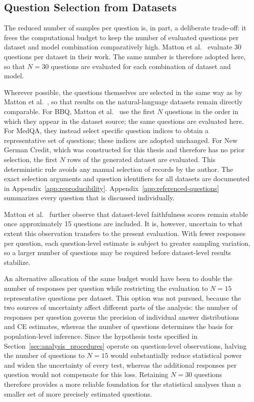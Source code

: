 \subsection{Question Selection from Datasets}
\label{sec:questions_per_dataset}
The reduced number of samples per question is, in part, a deliberate trade-off: it frees the computational budget to keep the number of evaluated questions per dataset and model combination comparatively high. Matton et al.~\cite{mattonWalkTalkMeasuring2024} evaluate 30 questions per dataset in their work. The same number is therefore adopted here, so that $N=30$ questions are evaluated for each combination of dataset and model.

Wherever possible, the questions themselves are selected in the same way as by Matton et al.~\cite{mattonWalkTalkMeasuring2024}, so that results on the natural-language datasets remain directly comparable. For BBQ, Matton et al.~\cite{mattonWalkTalkMeasuring2024} use the first $N$ questions in the order in which they appear in the dataset source; the same questions are evaluated here. For MedQA, they instead select specific question indices to obtain a representative set of questions; these indices are adopted unchanged. For New German Credit, which was constructed for this thesis and therefore has no prior selection, the first $N$ rows of the generated dataset are evaluated. This deterministic rule avoids any manual selection of records by the author. The exact selection arguments and question identifiers for all datasets are documented in Appendix~\ref{app:reproducibility}. Appendix~\ref{app:referenced-questions} summarizes every question that is discussed individually.

Matton et al.~\cite{mattonWalkTalkMeasuring2024} further observe that dataset-level faithfulness scores remain stable once approximately 15 questions are included. It is, however, uncertain to what extent this observation transfers to the present evaluation. With fewer responses per question, each question-level estimate is subject to greater sampling variation, so a larger number of questions may be required before dataset-level results stabilize.

An alternative allocation of the same budget would have been to double the number of responses per question while restricting the evaluation to $N=15$ representative questions per dataset. This option was not pursued, because the two sources of uncertainty affect different parts of the analysis: the number of responses per question governs the precision of individual answer distributions and CE estimates, whereas the number of questions determines the basis for population-level inference. Since the hypothesis tests specified in Section~\ref{sec:analysis_procedures} operate on question-level observations, halving the number of questions to $N=15$ would substantially reduce statistical power and widen the uncertainty of every test, whereas the additional responses per question would not compensate for this loss. Retaining $N=30$ questions therefore provides a more reliable foundation for the statistical analyses than a smaller set of more precisely estimated questions.

